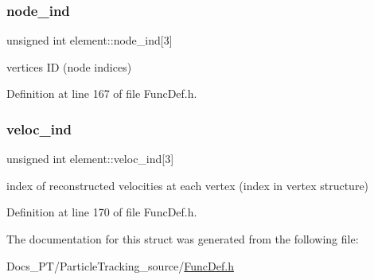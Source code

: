 \subsubsection{\texorpdfstring{node\_ind}{node\_ind}}
{\footnotesize\ttfamily unsigned int element\+::node\+\_\+ind\mbox{[}3\mbox{]}}

vertices ID (node indices) 

Definition at line 167 of file Func\+Def.\+h.

\mbox{\label{structelement_ab6062a713eca6e7458529ea45dea64d3}} 
\subsubsection{\texorpdfstring{veloc\_ind}{veloc\_ind}}
{\footnotesize\ttfamily unsigned int element\+::veloc\+\_\+ind\mbox{[}3\mbox{]}}

index of reconstructed velocities at each vertex (index in vertex structure) 

Definition at line 170 of file Func\+Def.\+h.



The documentation for this struct was generated from the following file\+:\begin{DoxyCompactItemize}
\item 
Docs\+\_\+\+P\+T/\+Particle\+Tracking\+\_\+source/\mbox{\hyperlink{_func_def_8h}{Func\+Def.\+h}}\end{DoxyCompactItemize}
